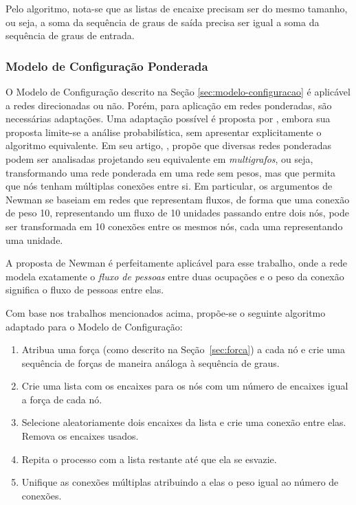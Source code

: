 \documentclass[12pt,a4paper]{article}
\theoremstyle{hypo}
\begin{document}
Pelo algoritmo, nota-se que as listas de encaixe precisam ser do mesmo tamanho, ou seja, a soma da sequência de graus de saída precisa ser igual a soma da sequência de graus de entrada.

\subsubsection{Modelo de Configuração Ponderada} \label{sec:modelo-configuracao-ponderada}

O Modelo de Configuração descrito na Seção \ref{sec:modelo-configuracao} é aplicável a redes direcionadas ou não. Porém, para aplicação em redes ponderadas, são necessárias adaptações. Uma adaptação possível é proposta por , embora sua proposta limite-se a análise probabilística, sem apresentar explicitamente o algoritmo equivalente. Em seu artigo, , propõe que diversas redes ponderadas podem ser analisadas projetando seu equivalente em \textit{multigrafos}, ou seja, transformando uma rede ponderada em uma rede sem pesos, mas que permita que nós tenham múltiplas conexões entre si. Em particular, os argumentos de Newman se baseiam em redes que representam fluxos, de forma que uma conexão de peso 10, representando um fluxo de 10 unidades passando entre dois nós, pode ser transformada em 10 conexões entre os mesmos nós, cada uma representando uma unidade.

A proposta de Newman é perfeitamente aplicável para esse trabalho, onde a rede modela exatamente o \textit{fluxo de pessoas} entre duas ocupações e o peso da conexão significa o fluxo de pessoas entre elas.

Com base nos trabalhos mencionados acima, propõe-se o seguinte algoritmo adaptado para o Modelo de Configuração:

\begin{enumerate}
\item Atribua uma força (como descrito na Seção~\ref{sec:forca}) a cada nó e crie uma sequência de forças de maneira análoga à sequência de graus.
\item Crie uma lista com os encaixes para os nós com um número de encaixes igual a força de cada nó.
\item Selecione aleatoriamente dois encaixes da lista e crie uma conexão entre elas. Remova os encaixes usados.
\item Repita o processo com a lista restante até que ela se esvazie.
\item Unifique as conexões múltiplas atribuindo a elas o peso igual ao número de conexões.
\end{enumerate}
\end{document}
